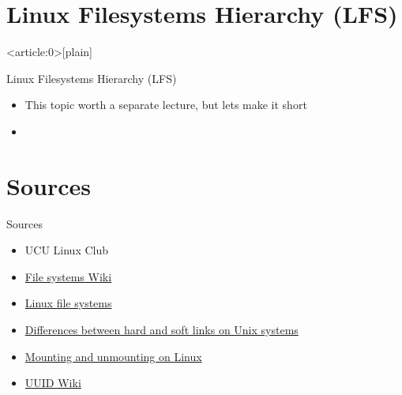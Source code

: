 \documentclass[usenames,dvipsnames,10pt,aspectratio=169]{beamer}
\begin{document}
\section{Linux Filesystems Hierarchy (LFS)}
{ %
    \begin{frame}<article:0>[plain]
     \end{frame}
}


\begin{frame}{Linux Filesystems Hierarchy (LFS)}
    \begin{itemize}
        \item This topic worth a separate lecture, but lets make it short 
        \item 
    \end{itemize}
\end{frame}


\section{Sources}
\begin{frame}{Sources}
    \begin{itemize}
        \item UCU Linux Club
        \item \href{https://en.wikipedia.org/wiki/File_system}{File systems Wiki}
        \item \href{https://www.javatpoint.com/linux-files}{Linux file systems}
        \item \href{http://www.differencebetween.net/technology/difference-between-soft-link-and-hard-link-in-unix-in-os/}{Differences between hard and soft links on Unix systems}
        \item \href{https://techviewleo.com/mounting-and-unmounting-filesystems-on-linux/}{Mounting and unmounting on Linux}
        \item \href{https://en.wikipedia.org/wiki/Universally_unique_identifier}{UUID Wiki}
    \end{itemize}
\end{frame}
\end{document}
